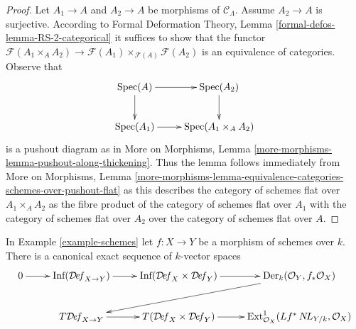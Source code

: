 \begin{proof}
Let $A_1 \to A$ and $A_2 \to A$ be morphisms of $\mathcal{C}_\Lambda$.
Assume $A_2 \to A$ is surjective. According to
Formal Deformation Theory, Lemma
\ref{formal-defos-lemma-RS-2-categorical}
it suffices to show that the functor
$\mathcal{F}(A_1 \times_A A_2) \to
\mathcal{F}(A_1) \times_{\mathcal{F}(A)} \mathcal{F}(A_2)$
is an equivalence of categories.
Observe that
$$
\xymatrix{
\Spec(A) \ar[r] \ar[d] & \Spec(A_2) \ar[d] \\
\Spec(A_1) \ar[r] &
\Spec(A_1 \times_A A_2)
}
$$
is a pushout diagram as in More on Morphisms, Lemma
\ref{more-morphisms-lemma-pushout-along-thickening}.
Thus the lemma follows immediately from
More on Morphisms, Lemma
\ref{more-morphisms-lemma-equivalence-categories-schemes-over-pushout-flat}
as this describes the category of schemes flat over $A_1 \times_A A_2$
as the fibre product of the category of schemes flat over $A_1$
with the category of schemes flat over $A_2$ over the category of
schemes flat over $A$.
\end{proof}

\begin{lemma}
\label{lemma-schemes-morphisms-TI}
In Example \ref{example-schemes} let $f : X \to Y$ be a morphism of schemes
over $k$. There is a canonical exact sequence of $k$-vector spaces
$$
\xymatrix{
0 \ar[r] &
\text{Inf}(\Deformationcategory_{X \to Y}) \ar[r] &
\text{Inf}(\Deformationcategory_X \times \Deformationcategory_Y) \ar[r] &
\text{Der}_k(\mathcal{O}_Y, f_*\mathcal{O}_X) \ar[lld] \\
& T\Deformationcategory_{X \to Y} \ar[r] &
T(\Deformationcategory_X \times \Deformationcategory_Y) \ar[r] &
\text{Ext}^1_{\mathcal{O}_X}(Lf^*\NL_{Y/k}, \mathcal{O}_X)
}
$$
\end{lemma}


